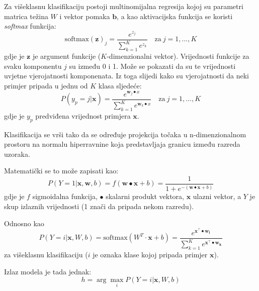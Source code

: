 \documentclass[times, utf8, diplomski, numeric]{fer}
\begin{document}
Za višeklasnu klasifikaciju postoji multinomijalna regresija kojoj su parametri matrica težina $W$ i vektor pomaka $\boldsymbol{b}$, a kao aktivacijska funkcija se koristi \textit{softmax} funkcija:
\begin{equation}
  \mathrm{softmax} \left( \boldsymbol{z} \right)_j = \frac{e^{z_j}}{\sum_{k=1}^{K} e^{z_k}} \quad \mathrm{za} \  j = 1, ..., K
\end{equation}
gdje je $\boldsymbol{z}$ je argument funkcije ($K$-dimenzionalni vektor). Vrijednosti funkcije za svaku komponentu $j$ su između 0 i 1. Može se pokazati da su te vrijednosti uvjetne vjerojatnosti komponenata. Iz toga slijedi kako su vjerojatnosti da neki primjer pripada u jednu od $K$ klasa sljedeće:
\begin{equation}
  P \left( y_p = j | \boldsymbol{x} \right) = \frac{e^{\boldsymbol{w}_j \bullet x}}{\sum_{k=1}^{K} e^{\boldsymbol{w}_k \bullet x}} \quad \mathrm{za} \  j = 1, ..., K
\end{equation}
gdje je $y_p$ predviđena vrijednost primjera $\boldsymbol{x}$.

Klasifikacija se vrši tako da se određuje projekcija točaka u n-dimenzionalnom prostoru na normalu hiperravnine koja predstavljaja granicu između razreda uzoraka.

Matematički se to može zapisati kao:
\begin{equation}
P(Y = 1 | \boldsymbol{x}, \boldsymbol{w}, b) = f(\boldsymbol{w} \bullet \boldsymbol{x} + b) = \frac{1}{1+e^{-(\boldsymbol{w} \bullet \boldsymbol{x} + b)}}
\label{eq:sigmoid}
\end{equation}
gdje je $f$ sigmoidalna funkcija, $\bullet$ skalarni produkt vektora, $\boldsymbol{x}$ ulazni vektor, a $Y$ je skup izlaznih vrijednosti (1 znači da pripada nekom razredu).

Odnosno kao
\begin{equation}
P(Y = i | \boldsymbol{x}, W, b) = \mathrm{softmax}(W^T \cdot \boldsymbol{x} + b) = \frac{e^{\boldsymbol{x}^{\top} \bullet \boldsymbol{w_i}}}{ \sum_{k=1}^K  e^{\boldsymbol{x}^{\top} \bullet \boldsymbol{w_k}}}
\label{eq:softmax}
\end{equation}
za višeklasnu klasifikaciju ($i$ je oznaka klase kojoj pripada primjer $\boldsymbol{x}$).

Izlaz modela je tada jednak:
\begin{equation}
h = \arg\max_i P(Y = i|\boldsymbol{x}, W, b)
\label{eq:model_out_arg}
\end{equation}
\end{document}
